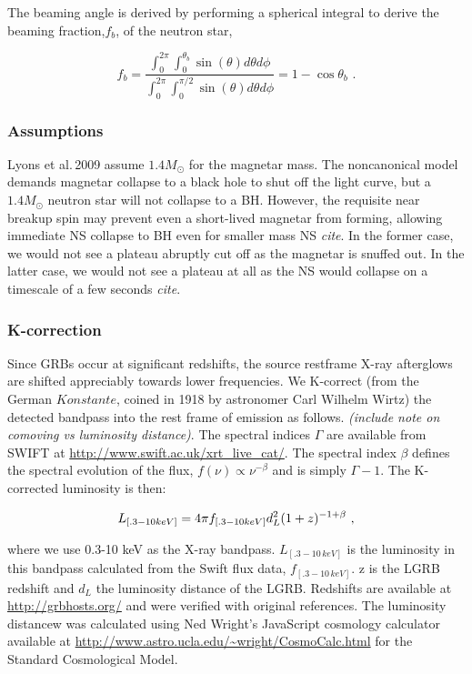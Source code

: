 \documentclass{article}
\begin{document}
The beaming angle is derived by performing a spherical integral to derive the beaming fraction,$f_b$, of the neutron star,

\begin{equation}
f_b=\frac{\int_0^{2\pi} \int_0^{\theta_b} \sin(\theta) d\theta d\phi}{\int_0^{2\pi} \int_0^{\pi/2} \sin(\theta) d\theta d\phi} = 1-\cos{\theta_b}\,\,.
\end{equation}

\subsubsection{Assumptions}

Lyons et al.\,2009 assume $1.4 M_{\odot}$ for the magnetar mass. The noncanonical model demands magnetar collapse to a black hole to shut off the light curve, but a $1.4 M_{\odot}$  neutron star will not collapse to a BH. However, the requisite near breakup spin may prevent even a short-lived magnetar from forming, allowing immediate NS collapse to BH even for smaller mass NS \textit{cite}. In the former case, we would not see a plateau abruptly cut off as the magnetar is snuffed out. In the latter case, we would not see a plateau at all as the NS would collapse on a timescale of a few seconds \textit{cite}.
\hspace{2cm}

\subsubsection{K-correction}
Since GRBs occur at significant redshifts, the source restframe X-ray afterglows are shifted appreciably towards lower frequencies. We K-correct (from the German $Konstante$, coined in 1918 by astronomer Carl Wilhelm Wirtz) the detected bandpass into the rest frame of emission  as follows. \textit{(include note on comoving vs luminosity distance)}. The spectral indices $\Gamma$ are available from SWIFT at \url{http://www.swift.ac.uk/xrt_live_cat/}. The spectral index $\beta$ defines the spectral evolution of the flux, $f(\nu) \propto \nu^{-\beta}$ and is simply $\Gamma -1$. The K-corrected luminosity is then:

\begin{equation} L_{[.3-10 keV]} = 4\pi\* f_{[.3-10 keV]}d_{L}^2  (1+z)^{-1+\beta}\,\,,
\end{equation}

where we use 0.3-10 keV as the X-ray bandpass.  $L_{[.3-10\,keV]}$ is the luminosity in this bandpass calculated from the Swift flux data,  $f_{[.3-10\,keV]}$. z is the LGRB redshift and $d_L$ the luminosity distance of the LGRB. Redshifts are available at \url{http://grbhosts.org/} and were verified with original references. The luminosity distancew was calculated using Ned Wright's JavaScript cosmology calculator available at \url{http://www.astro.ucla.edu/~wright/CosmoCalc.html} for the Standard Cosmological Model.
\end{document}
